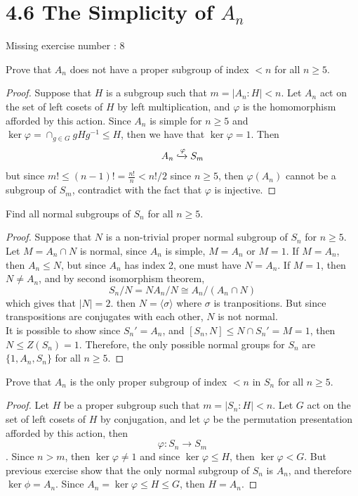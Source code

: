 \documentclass{article}
\newenvironment{problem}[2][Problem]{\begin{trivlist}
\item[\hskip \labelsep {\bfseries #1}\hskip \labelsep {\bfseries #2.}]}{\end{trivlist}}
\begin{document}
\section*{4.6 The Simplicity of $A_n$}
Missing exercise number : 8
\begin{problem}{1}
 Prove that $A_n$ does not have a proper subgroup of index $< n$ for all $n \geq 5$.
\end{problem}
\begin{proof}
    Suppose that $H$ is a subgroup such that $m=|A_n:H|<n$. Let $A_n$ act on the set of left cosets of $H$ by left multiplication, and $\varphi$ is the homomorphism afforded by this action. Since $A_n$ is simple for $n\geq 5$ and $\ker \varphi =\cap_{g \in G} g Hg^{-1}\leq H$, then we have that $\ker \varphi=1$. Then 
    \[
         A_n \xhookrightarrow{\varphi} S_m
    \]
    but since $m!\leq (n-1)!=\frac{n!}{n}< n!/2$ since $n\geq 5$, then $\varphi(A_n)$ cannot be a subgroup of $S_m$, contradict with the fact that $\varphi$ is injective.
\end{proof}
\begin{problem}{2}
     Find all normal subgroups of $S_n$ for all $n \geq 5$.
\end{problem}
\begin{proof}
    Suppose that $N$ is a non-trivial proper normal subgroup of $S_n$ for $n\geq 5$. Let $M=A_n\cap N$ is normal, since $A_n$ is simple, $M=A_n$ or $M=1$. If $M=A_n$, then $A_n\leq N$, but since $A_n$ has index 2, one must have $N=A_n$. If $M=1$, then $N\neq A_n$, and by second isomorphism theorem, 
    \[
        S_n/N = NA_n/N \cong A_n/(A_n \cap N)
    \]
    which gives that $|N|=2$. then $N=\langle \sigma \rangle$ where $\sigma$ is tranpositions. But since transpositions are conjugates with each other, $N$ is not normal.\\
    It is possible to show since $S_n'=A_n$, and $[S_n, N]\leq N\cap S_n'=M=1$, then $N\leq Z(S_n)=1$.
    Therefore, the only possible normal groups for $S_n$ are $\{1, A_n, S_n\}$ for all $n\geq 5$.
\end{proof}
\begin{problem}{3}
    Prove that $A_n$ is the only proper subgroup of index $< n$ in $S_n$ for all $n \geq 5$.
\end{problem}
\begin{proof}
    Let $H$ be a proper subgroup such that $m=|S_n:H|<n$. Let $G$ act on the set of left cosets of $H$ by conjugation, and let $\varphi$ be the permutation presentation afforded by this action, then 
    \[
        \varphi : S_n \rightarrow S_m 
    \]
    . Since $n>m$, then $\ker \varphi \neq 1 $ and since $\ker \varphi \leq H$, then $\ker \varphi <G$. But previous exercise show that the only normal subgroup of $S_n$ is $A_n$, and therefore $\ker\phi =A_n$. Since $A_n =\ker \varphi \leq H \leq G$, then $H=A_n$.   
\end{proof}
\end{document}
